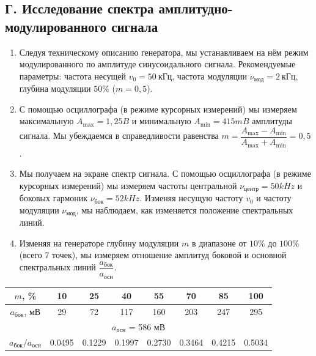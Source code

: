 \documentclass[a4paper]{article}
\begin{document}
\newpage

\subsection{Г. Исследование спектра амплитудно-модулированного сигнала}

\begin{enumerate}
    \item[\textbf{1}] Следуя техническому описанию генератора, мы устанавливаем на нём режим модулированного по амплитуде синусоидального сигнала. 
    Рекомендуемые параметры: частота несущей $v_0 = 50~\text{кГц}$, частота модуляции $\nu_{\text{мод}} = 2~\text{кГц}$, глубина модуляции $50\%$ ($m = 0{,}5$). 

    \item[\textbf{2}] С помощью осциллографа (в режиме курсорных измерений) мы измеряем максимальную $A_{\max} = 1,25 B$ и минимальную $A_{\min} = 415 mB$ амплитуды сигнала. 
    Мы убеждаемся в справедливости равенства $m = \dfrac{A_{\max} - A_{\min}}{A_{\max} + A_{\min}} = 0,5$.

    \item[\textbf{3}] Мы получаем на экране спектр сигнала. С помощью осциллографа (в режиме курсорных измерений) мы измеряем частоты центральной $\nu_{\text{центр}} = 50 kHz$ и боковых гармоник  $\nu_{\text{бок}} = 52 kHz$. 
    Изменяя несущую частоту $v_0$ и частоту модуляции $\nu_{\text{мод}}$, мы наблюдаем, как изменяется положение спектральных линий. 

    \item[\textbf{4}] Изменяя на генераторе глубину модуляции $m$ в диапазоне от $10\%$ до $100\%$ (всего 7 точек), 
    мы измеряем отношение амплитуд боковой и основной спектральных линий $\dfrac{a_{\text{бок}}}{a_{\text{осн}}}$.

\end{enumerate}

\begin{center}
\begin{tabular}{|c|c|c|c|c|c|c|c|}
\hline
$m$, \% & 10 & 25 & 40 & 55 & 70 & 85 & 100 \\ \hline
$a_{\text{бок}}$, мВ & 29 & 72 & 117 & 160 & 203 & 247 & 295 \\ \hline
\multicolumn{8}{|c|}{$a_{\text{осн}}$ = 586 мВ} \\ \hline
$a_{\text{бок}}/a_{\text{осн}}$ & 0.0495 &0.1229  &0.1997  & 0.2730 & 	
0.3464 & 0.4215 &0.5034 \\ \hline
\end{tabular}
\end{center}
\end{document}
